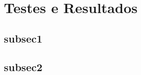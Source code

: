 \chapter{Testes e Resultados} \label{chap:testsResults}
	\begin{myenv}{1.5}
		
		\section{subsec1}
		\section{subsec2}
		
	\end{myenv}